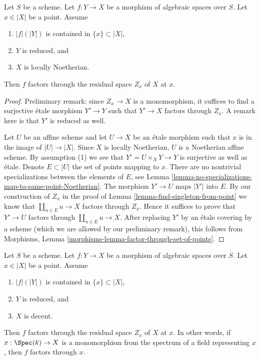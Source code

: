 \begin{lemma}
\label{lemma-factor-through-residual-space-Noetherian}
Let $S$ be a scheme. Let $f : Y \to X$ be a morphism of algebraic
spaces over $S$. Let $x \in |X|$ be a point. Assume
\begin{enumerate}
\item $|f|(|Y|)$ is contained in $\{x\} \subset |X|$,
\item $Y$ is reduced, and
\item $X$ is locally Noetherian.
\end{enumerate}
Then $f$ factors through the residual space $Z_x$ of $X$ at $x$.
\end{lemma}

\begin{proof}
Preliminary remark: since $Z_x \to X$ is a monomorphism, it suffices to find
a surjective \'etale morphism $Y' \to Y$ such that $Y' \to X$
factors through $Z_x$. A remark here is that $Y'$ is reduced as well.

\medskip\noindent
Let $U$ be an affine scheme and let $U \to X$ be an \'etale morphism
such that $x$ is in the image of $|U| \to |X|$. Since $X$ is locally
Noetherian, $U$ is a Noetherian affine scheme. By assumption (1)
we see that $Y' = U \times_X Y \to Y$ is surjective as well as \'etale.
Denote $E \subset |U|$ the set of points mapping to $x$.
There are no nontrivial specializations between the elements of $E$, see
Lemma \ref{lemma-no-specializations-map-to-same-point-Noetherian}.
The morphism $Y' \to U$ maps $|Y'|$ into $E$. By our construction
of $Z_x$ in the proof of Lemma \ref{lemma-find-singleton-from-point}
we know that $\coprod_{u \in E} u \to X$ factors through $Z_x$.
Hence it suffices to prove that $Y' \to U$ factors through
$\coprod_{u \in E} u \to X$. After replacing $Y'$ by an \'etale covering
by a scheme (which we are allowed by our preliminary remark), this follows
from Morphisms, Lemma \ref{morphisms-lemma-factor-through-set-of-points}.
\end{proof}

\begin{lemma}
\label{lemma-factor-through-residual-space-decent}
Let $S$ be a scheme. Let $f : Y \to X$ be a morphism of algebraic
spaces over $S$. Let $x \in |X|$ be a point. Assume
\begin{enumerate}
\item $|f|(|Y|)$ is contained in $\{x\} \subset |X|$,
\item $Y$ is reduced, and
\item $X$ is decent.
\end{enumerate}
Then $f$ factors through the residual space $Z_x$ of $X$ at $x$.
In other words, if $x : \Spec(k) \to X$ is a monomorphism from the
spectrum of a field representing $x$, then $f$ factors through $x$.
\end{lemma}

